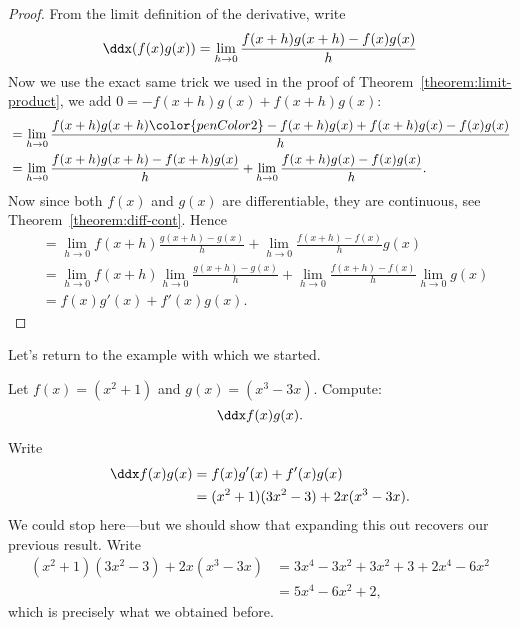 \begin{proof}
From the limit definition of the derivative, write
\[
\ddx (f(x)g(x)) = \lim_{h \to0} \frac{f(x+h)g(x+h) - f(x)g(x)}{h}
\]
Now we use the exact same trick we used in the proof of
Theorem~\ref{theorem:limit-product}, we add $0 = -f(x+h)g(x) + f(x+h)g(x)$:
\begin{align*}
&=\lim_{h \to0} \frac{f(x+h)g(x+h){\color{penColor2}-f(x+h)g(x) + f(x+h)g(x)}- f(x)g(x)}{h} \\ 
&=\lim_{h \to0} \frac{f(x+h)g(x+h)-f(x+h)g(x)}{h} + \lim_{h \to0} \frac{f(x+h)g(x)- f(x)g(x)}{h}.
\end{align*}
Now since both $f(x)$ and $g(x)$ are differentiable, they are
continuous, see Theorem~\ref{theorem:diff-cont}. Hence
\begin{align*}
&=\lim_{h \to0} f(x+h)\frac{g(x+h)-g(x)}{h} + \lim_{h \to0} \frac{f(x+h)- f(x)}{h}g(x) \\ 
&=\lim_{h \to0} f(x+h)\lim_{h \to0}\frac{g(x+h)-g(x)}{h} + \lim_{h \to0} \frac{f(x+h)- f(x)}{h}\lim_{h \to0}g(x) \\ 
&=f(x)g'(x) + f'(x)g(x).
\end{align*}
\end{proof}



Let's return to the example with which we started.
\begin{example} 
Let $f(x)=(x^2+1)$ and $g(x)=(x^3-3x)$. Compute:
\[
\ddx f(x)g(x).
\]
\end{example}
\begin{solution}
Write
\begin{align*}
\ddx f(x)g(x) &= f(x)g'(x) + f'(x)g(x)\\
&=(x^2+1)(3x^2-3) + 2x(x^3-3x).
\end{align*}
We could stop here---but we should show that expanding this out recovers our previous result. Write
\begin{align*}
(x^2+1)(3x^2-3) + 2x(x^3-3x) &= 3x^4-3x^2 +3x^2 +3 + 2x^4-6x^2\\
&=5x^4-6x^2+2,
\end{align*}
which is precisely what we obtained before.
\end{solution}




